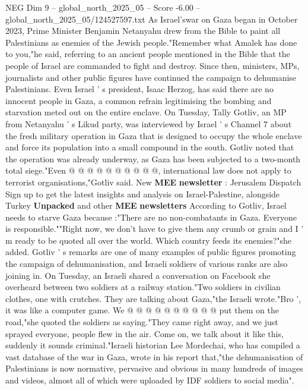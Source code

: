 \begin{textsample}{NEG Dim 9 – global\_north\_2025\_05 – Score -6.00 – global\_north\_2025\_05/124527597.txt}  \label{ex:f9_neg_094}
As Israel'swar on Gaza began in October 2023, Prime Minister Benjamin Netanyahu drew from the Bible to paint all Palestinians as enemies of the Jewish people."Remember what Amalek has done to you,"he said, referring to an ancient people mentioned in the Bible that the people of Israel are commanded to fight and destroy.
Since then, ministers, MPs, journalists and other public figures have continued the campaign to dehumanise Palestinians.
Even Israel ' s president, Isaac Herzog, has said there are no innocent people in Gaza, a common refrain legitimising the bombing and starvation meted out on the entire enclave.
On Tuesday, Tally Gotliv, an MP from Netanyahu ' s Likud party, was interviewed by Israel ' s Channel 7 about the fresh military operation in Gaza that is designed to occupy the whole enclave and force its population into a small compound in the south.
Gotliv noted that the operation was already underway, as Gaza has been subjected to a two-month total siege."Even @ @ @ @ @ @ @ @ @ @, international law does not apply to terrorist organisations,"Gotliv said.
New \textbf{MEE} \textbf{newsletter} : Jerusalem Dispatch Sign up to get the latest insights and analysis on Israel-Palestine, alongside Turkey \textbf{Unpacked} and other \textbf{MEE} \textbf{newsletters} According to Gotliv, Israel needs to starve Gaza because :"There are no non-combatants in Gaza.
Everyone is responsible.""Right now, we don't have to give them any crumb or grain and I ' m ready to be quoted all over the world.
Which country feeds its enemies?"she added.
Gotliv ' s remarks are one of many examples of public figures promoting the campaign of dehumanisation, and Israeli soldiers of various ranks are also joining in.
On Tuesday, an Israeli shared a conversation on Facebook she overheard between two soldiers at a railway station."Two soldiers in civilian clothes, one with crutches.
They are talking about Gaza,"the Israeli wrote."Bro ', it was like a computer game.
We @ @ @ @ @ @ @ @ @ @ put them on the road,"she quoted the soldiers as saying."They came right away, and we just sprayed everyone, people flew in the air.
Come on, we talk about it like this, suddenly it sounds criminal."Israeli historian Lee Mordechai, who has compiled a vast database of the war in Gaza, wrote in his report that,"the dehumanisation of Palestinians is now normative, pervasive and obvious in many hundreds of images and videos, almost all of which were uploaded by IDF soldiers to social media".

\end{textsample}
